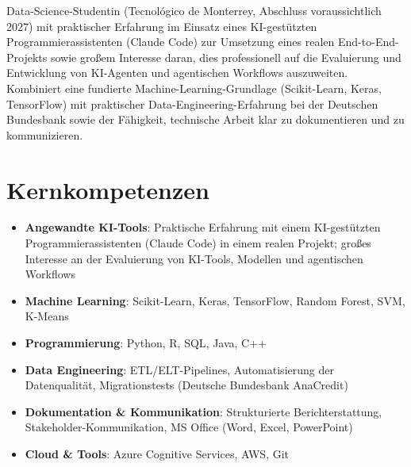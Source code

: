 \documentclass[11pt,a4paper,sans]{moderncv}
\begin{document}
\makecvtitle


\vspace{6pt}
\small{Data-Science-Studentin (Tecnológico de Monterrey, Abschluss voraussichtlich 2027) mit praktischer Erfahrung im Einsatz eines KI-gestützten Programmierassistenten (Claude Code) zur Umsetzung eines realen End-to-End-Projekts sowie großem Interesse daran, dies professionell auf die Evaluierung und Entwicklung von KI-Agenten und agentischen Workflows auszuweiten. Kombiniert eine fundierte Machine-Learning-Grundlage (Scikit-Learn, Keras, TensorFlow) mit praktischer Data-Engineering-Erfahrung bei der Deutschen Bundesbank sowie der Fähigkeit, technische Arbeit klar zu dokumentieren und zu kommunizieren.}


\section{Kernkompetenzen}
\vspace{1pt}
\begin{itemize}

\item \textbf{Angewandte KI-Tools}: Praktische Erfahrung mit einem KI-gestützten Programmierassistenten (Claude Code) in einem realen Projekt; großes Interesse an der Evaluierung von KI-Tools, Modellen und agentischen Workflows

\item \textbf{Machine Learning}: Scikit-Learn, Keras, TensorFlow, Random Forest, SVM, K-Means

\item \textbf{Programmierung}: Python, R, SQL, Java, C++

\item \textbf{Data Engineering}: ETL/ELT-Pipelines, Automatisierung der Datenqualität, Migrationstests (Deutsche Bundesbank AnaCredit)

\item \textbf{Dokumentation \& Kommunikation}: Strukturierte Berichterstattung, Stakeholder-Kommunikation, MS Office (Word, Excel, PowerPoint)

\item \textbf{Cloud \& Tools}: Azure Cognitive Services, AWS, Git

\end{itemize}
\end{document}

